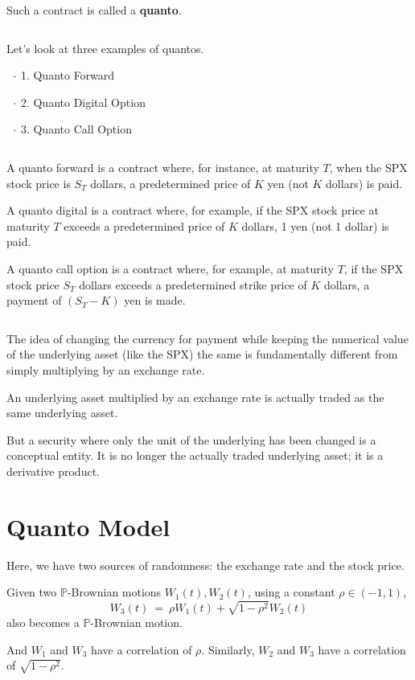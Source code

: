 \documentclass[uplatex,a4j,12pt,dvipdfmx]{jsarticle}
\begin{document}
Such a contract is called a \textbf{quanto}.

${}$

Let's look at three examples of quantos.

$\hspace{2mm} \cdot$
1. Quanto Forward

$\hspace{2mm} \cdot$
2. Quanto Digital Option

$\hspace{2mm} \cdot$
3. Quanto Call Option

${}$

A quanto forward is a contract where, for instance, at maturity $T$,
when the SPX stock price is $S_{T}$ dollars,
a predetermined price of $K$ yen (not $K$ dollars) is paid.

A quanto digital is a contract where, for example,
if the SPX stock price at maturity $T$
exceeds a predetermined price of $K$ dollars,
1 yen (not 1 dollar) is paid.

A quanto call option is a contract where, for example,
at maturity $T$, if the SPX stock price $S_{T}$ dollars
exceeds a predetermined strike price of $K$ dollars,
a payment of $(S_{T}-K)$ yen is made.

${}$

The idea of changing the currency for payment while keeping the numerical value
of the underlying asset (like the SPX) the same is fundamentally different
from simply multiplying by an exchange rate.

An underlying asset multiplied by an exchange rate is actually traded as the same underlying asset.

But a security where only the unit of the underlying has been changed is a conceptual entity.
It is no longer the actually traded underlying asset; it is a derivative product.

\section{Quanto Model}

Here, we have two sources of randomness: the exchange rate and the stock price.

Given two $\mathbb{P}$-Brownian motions $W_{1}(t),W_{2}(t)$,
using a constant $\rho \in (-1,1)$,
$$
	W_{3}(t)
	\ = \
	\rho W_{1}(t) +
	\sqrt{1 - \rho^{2} } W_{2}(t)
$$
also becomes a $\mathbb{P}$-Brownian motion.

And $W_{1}$ and $W_{3}$ have a correlation of $\rho$.
Similarly, $W_{2}$ and $W_{3}$ have a correlation of $\sqrt{1 - \rho^{2}}$.
\end{document}
